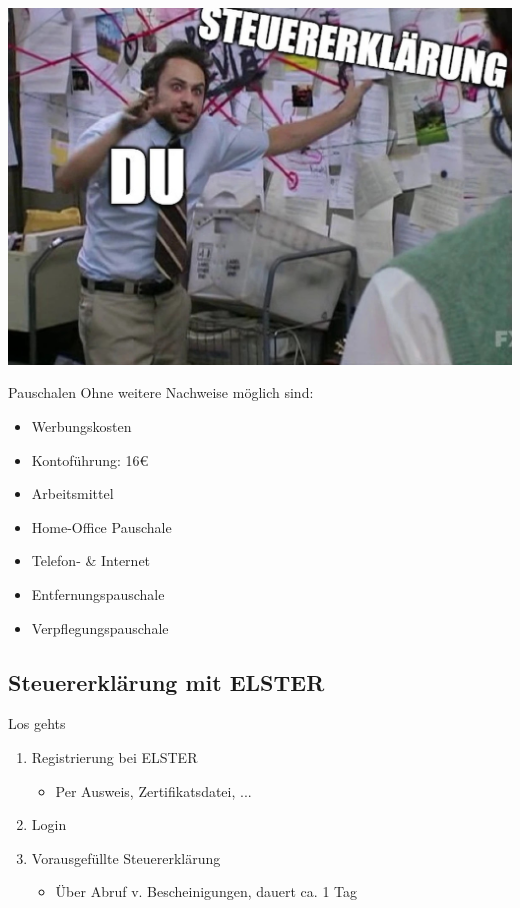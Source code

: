 \documentclass{beamer}
\begin{document}
			\begin{frame}
				\begin{center}
					\includegraphics[height=0.9\textheight]{images/meme-tax-insane.jpg}
				\end{center}
			\end{frame}
		
			\begin{frame}{Pauschalen}
				Ohne weitere Nachweise möglich sind:
				\begin{itemize}
					\item Werbungskosten
					\item Kontoführung: 16€
					\pause
					\item Arbeitsmittel
					\item Home-Office Pauschale
					\item Telefon- \& Internet
					\pause
					\item Entfernungspauschale
					\item Verpflegungspauschale
				\end{itemize}
			\end{frame}
		
		\subsection{Steuererklärung mit ELSTER}
		
			\begin{frame}{Los gehts}
				\begin{enumerate}
					\item Registrierung bei ELSTER
					\begin{itemize}
						\item Per Ausweis, Zertifikatsdatei, ...
					\end{itemize}\pause
					\item Login\pause
					\item Vorausgefüllte Steuererklärung
					\begin{itemize}
						\item Über Abruf v. Bescheinigungen, dauert ca. 1 Tag
					\end{itemize}
				\end{enumerate}
			\end{frame}
		
\end{document}

